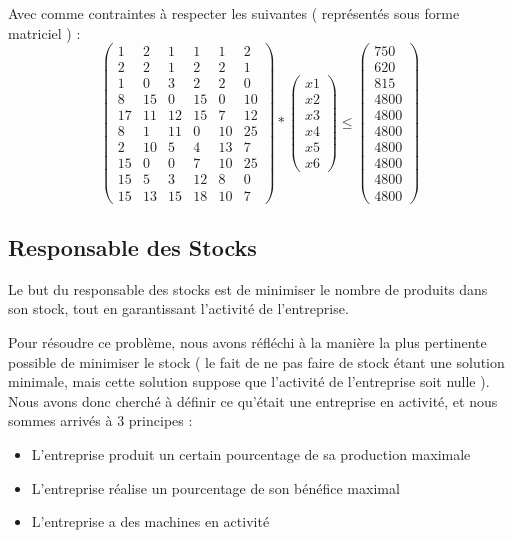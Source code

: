 \documentclass{article}
\begin{document}
Avec comme contraintes à respecter les suivantes ( représentés sous forme matriciel ) :
\[
\begin{pmatrix} 
   1 & 2 & 1 & 1 & 1 & 2 \\ 
   2 & 2 & 1 & 2 & 2 & 1 \\
   1 & 0 & 3 & 2 & 2 & 0 \\
   8 &15 & 0& 15& 0 & 10 \\
  17 & 11 & 12 & 15 & 7 & 12 \\
   8 & 1 & 11 & 0 & 10 & 25 \\
   2 & 10 & 5 & 4 & 13 & 7 \\
   15 & 0 & 0 & 7 & 10 & 25 \\
   15 & 5 & 3 & 12 & 8 & 0 \\
   15 & 13 & 15 & 18 & 10 & 7
\end{pmatrix} *\begin{pmatrix} 
   x1 \\ 
   x2 \\
   x3 \\
   x4 \\
   x5 \\ 
   x6 
  \end{pmatrix} \le \begin{pmatrix} 
   750\\ 
   620 \\
   815 \\
   4800\\
   4800 \\ 
4800 \\ 
4800 \\ 
4800 \\ 
4800 \\ 
   4800
  \end{pmatrix}
   \]


\subsection{Responsable des Stocks}

Le but du responsable des stocks est de minimiser le nombre de produits dans son stock, tout en garantissant l'activité de l'entreprise.

Pour résoudre ce problème, nous avons réfléchi à la manière la plus pertinente possible de minimiser le stock ( le fait de ne pas faire de stock étant une solution minimale, mais cette solution suppose que l'activité de l'entreprise soit nulle ). Nous avons donc cherché à définir ce qu'était une entreprise en activité, et nous sommes arrivés à 3 principes  :
\begin{itemize} 
\item L'entreprise produit un certain pourcentage de sa production maximale
\item L'entreprise réalise un pourcentage de son bénéfice maximal
\item L'entreprise a des machines en activité
\end{itemize} \ \\ 
\end{document}
